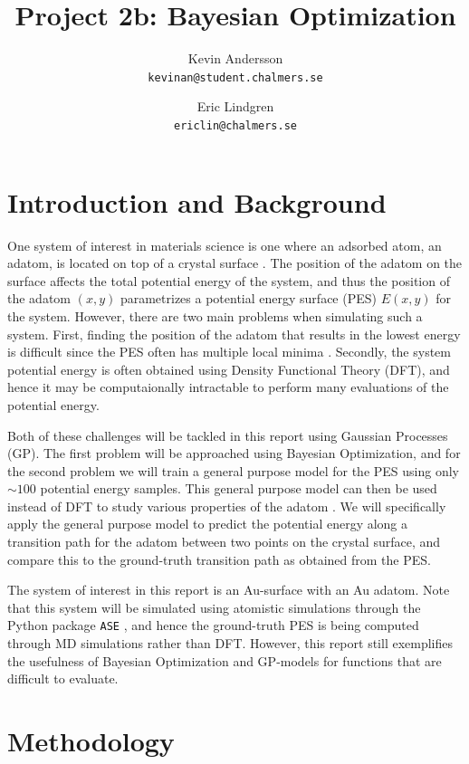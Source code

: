 \documentclass[11pt,a4paper]{article}
\title{Project 2b: Bayesian Optimization}
\author{
  Kevin Andersson\\
  \texttt{kevinan@student.chalmers.se}
  \and
   Eric Lindgren\\
  \texttt{ericlin@chalmers.se}
}
\begin{document}
\maketitle

{}%
\setcounter{page}{1}
\section{Introduction and Background}

One system of interest in materials science is one where an adsorbed atom, an adatom, is located on top of a crystal surface \cite{wiki_adatom}. The position of the adatom on the surface affects the total potential energy of the system, and thus the position of the adatom $(x,y)$ parametrizes a potential energy surface (PES) $E(x,y)$ for the system. However, there are two main problems when simulating such a system. First, finding the position of the adatom that results in the lowest energy is difficult since the PES often has multiple local minima \cite{project_pm}. Secondly, the system potential energy is often obtained using Density Functional Theory (DFT), and hence it may be computaionally intractable to perform many evaluations of the potential energy.

Both of these challenges will be tackled in this report using Gaussian Processes (GP). The first problem will be approached using Bayesian Optimization, and for the second problem we will train a general purpose model for the PES using only $\sim 100$ potential energy samples. This general purpose model can then be used instead of DFT to study various properties of the adatom \cite{project_pm}. We will specifically apply the general purpose model to predict the potential energy along a transition path for the adatom between two points on the crystal surface, and compare this to the ground-truth transition path as obtained from the PES.

The system of interest in this report is an Au-surface with an Au adatom. Note that this system will be simulated using atomistic simulations through the Python package \texttt{ASE} \cite{ASE}, and hence the ground-truth PES is being computed through MD simulations rather than DFT. However, this report still exemplifies the usefulness of Bayesian Optimization and GP-models for functions that are difficult to evaluate.

\section{Methodology}
\end{document}
